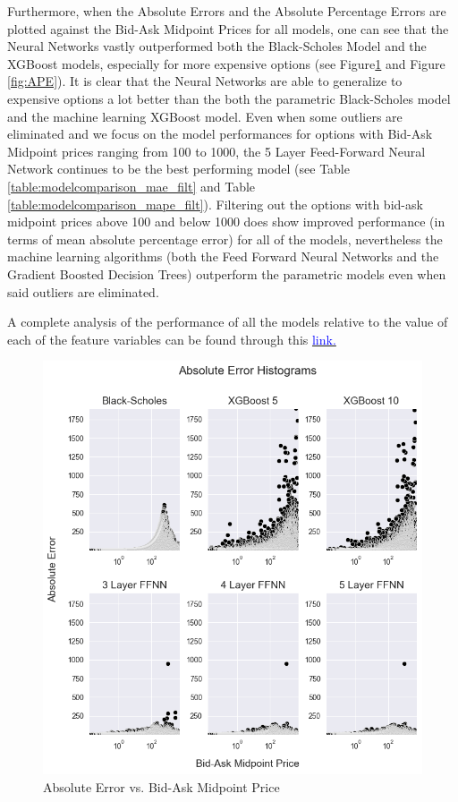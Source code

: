 \documentclass[a4paper]{article}
\begin{document}
Furthermore, when the Absolute Errors and the Absolute Percentage Errors are plotted against the Bid-Ask Midpoint Prices for all models, one can see that the Neural Networks vastly outperformed both the Black-Scholes Model and the XGBoost models, especially for more expensive options (see Figure\ref{fig:AE} and Figure \ref{fig:APE}). It is clear that the Neural Networks are able to generalize to expensive options a lot better than the both the parametric Black-Scholes model and the machine learning XGBoost model. Even when some outliers are eliminated and we focus on the model performances for options with Bid-Ask Midpoint prices ranging from 100 to 1000, the 5 Layer Feed-Forward Neural Network continues to be the best performing model (see Table \ref{table:modelcomparison_mae_filt} and Table \ref{table:modelcomparison_mape_filt}). Filtering out the options with bid-ask midpoint prices above 100 and below 1000 does show improved performance (in terms of mean absolute percentage error) for all of the models, nevertheless the machine learning algorithms (both the Feed Forward Neural Networks and the Gradient Boosted Decision Trees) outperform the parametric models even when said outliers are eliminated.

A complete analysis of the performance of all the models relative to the value of each of the feature variables can be found through this \href{https://github.com/juan-esteban-berger/Options_Pricing_with_Neural_Networks_and_Gradient_Boosters/blob/main/04_Results.ipynb}{\textcolor{blue}{link.}}

\begin{figure}[H]
    \centering
    \includegraphics[width=\linewidth]{AE.png}
    \caption{Absolute Error vs. Bid-Ask Midpoint Price}
    \label{fig:AE}
  \end{figure}
\end{document}
